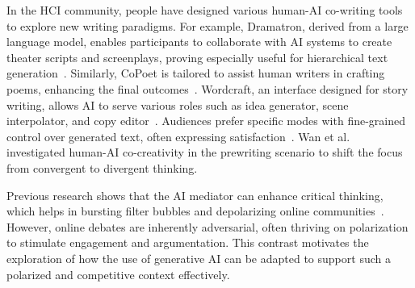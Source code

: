 In the HCI community, people have designed various human-AI co-writing tools to explore new writing paradigms. For example, Dramatron, derived from a large language model, enables participants to collaborate with AI systems to create theater scripts and screenplays, proving especially useful for hierarchical text generation~\cite{mirowski_co-writing_2023}. Similarly, CoPoet is tailored to assist human writers in crafting poems, enhancing the final outcomes~\cite{chakrabarty_help_2022}. Wordcraft, an interface designed for story writing, allows AI to serve various roles such as idea generator, scene interpolator, and copy editor~\cite{yuan_wordcraft_2022}. Audiences prefer specific modes with fine-grained control over generated text, often expressing satisfaction~\cite{zhong_fiction-writing_2023}. Wan et al.~\cite{wan_it_2024} investigated human-AI co-creativity in the prewriting scenario to shift the focus from convergent to divergent thinking.

Previous research shows that the AI mediator can enhance critical thinking, which helps in bursting filter bubbles and depolarizing online communities~\cite{govers_ai-driven_2024, tanprasert_debate_2024, lin_case_2024}. However, online debates are inherently adversarial, often thriving on polarization to stimulate engagement and argumentation. This contrast motivates the exploration of how the use of generative AI can be adapted to support such a polarized and competitive context effectively.